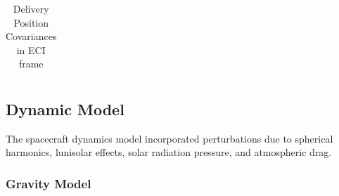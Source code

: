 \documentclass[conf]{new-aiaa}
\begin{document}
\begin{table}[H]
\begin{tabular}{ c c }
		\bottomrule
	\end{tabular}
	\caption{Delivery Position Covariances in ECI frame}
\end{table}












\subsection{Dynamic Model}

The spacecraft dynamics model incorporated perturbations due to spherical harmonics, lunisolar effects, solar radiation pressure, and atmospheric drag. 

\subsubsection{Gravity Model}
\end{document}
